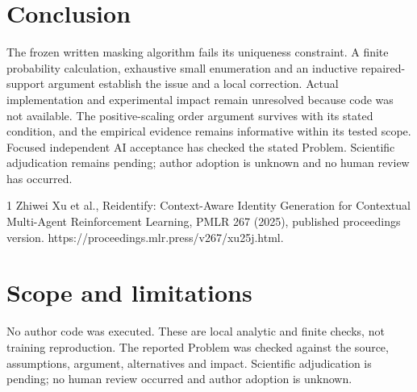 \documentclass[10pt]{article}
\begin{document}
\section*{Conclusion}
The frozen written masking algorithm fails its uniqueness constraint. A finite probability calculation, exhaustive small enumeration and an inductive repaired-support argument establish the issue and a local correction. Actual implementation and experimental impact remain unresolved because code was not available. The positive-scaling order argument survives with its stated condition, and the empirical evidence remains informative within its tested scope. Focused independent AI acceptance has checked the stated Problem. Scientific adjudication remains pending; author adoption is unknown and no human review has occurred.\par
1 Zhiwei Xu et al., Reidentify: Context-Aware Identity Generation for Contextual Multi-Agent Reinforcement Learning, PMLR 267 (2025), published proceedings version. https://proceedings.mlr.press/v267/xu25j.html.\par
\section*{Scope and limitations}
No author code was executed. These are local analytic and finite checks, not training reproduction. The reported Problem was checked against the source, assumptions, argument, alternatives and impact. Scientific adjudication is pending; no human review occurred and author adoption is unknown.\par
\end{document}
